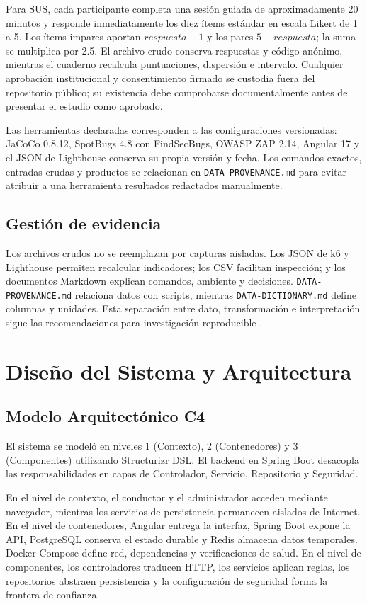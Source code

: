 \documentclass[11pt,a4paper]{report}
\begin{document}
Para SUS, cada participante completa una sesión guiada de aproximadamente 20 minutos y responde inmediatamente los diez ítems estándar en escala Likert de 1 a 5. Los ítems impares aportan $respuesta-1$ y los pares $5-respuesta$; la suma se multiplica por 2.5. El archivo crudo conserva respuestas y código anónimo, mientras el cuaderno recalcula puntuaciones, dispersión e intervalo. Cualquier aprobación institucional y consentimiento firmado se custodia fuera del repositorio público; su existencia debe comprobarse documentalmente antes de presentar el estudio como aprobado.

Las herramientas declaradas corresponden a las configuraciones versionadas: JaCoCo 0.8.12, SpotBugs 4.8 con FindSecBugs, OWASP ZAP 2.14, Angular 17 y el JSON de Lighthouse conserva su propia versión y fecha. Los comandos exactos, entradas crudas y productos se relacionan en \texttt{DATA-PROVENANCE.md} para evitar atribuir a una herramienta resultados redactados manualmente.

\section{Gestión de evidencia}
Los archivos crudos no se reemplazan por capturas aisladas. Los JSON de k6 y Lighthouse permiten recalcular indicadores; los CSV facilitan inspección; y los documentos Markdown explican comandos, ambiente y decisiones. \texttt{DATA-PROVENANCE.md} relaciona datos con scripts, mientras \texttt{DATA-DICTIONARY.md} define columnas y unidades. Esta separación entre dato, transformación e interpretación sigue las recomendaciones para investigación reproducible \cite{sandve2013ten, ralph2021empirical}.

\chapter{Diseño del Sistema y Arquitectura}
\section{Modelo Arquitectónico C4}
El sistema se modeló en niveles 1 (Contexto), 2 (Contenedores) y 3 (Componentes) utilizando Structurizr DSL. El backend en Spring Boot desacopla las responsabilidades en capas de Controlador, Servicio, Repositorio y Seguridad.

En el nivel de contexto, el conductor y el administrador acceden mediante navegador, mientras los servicios de persistencia permanecen aislados de Internet. En el nivel de contenedores, Angular entrega la interfaz, Spring Boot expone la API, PostgreSQL conserva el estado durable y Redis almacena datos temporales. Docker Compose define red, dependencias y verificaciones de salud. En el nivel de componentes, los controladores traducen HTTP, los servicios aplican reglas, los repositorios abstraen persistencia y la configuración de seguridad forma la frontera de confianza.
\end{document}
